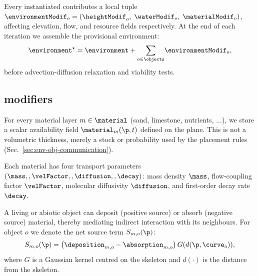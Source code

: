 
\section{}
\label{sec:env-obj-materials}

Every instantiated  contributes a local  tuple $\environmentModif_o=(\heightModif_o, \;\waterModif_o, \;\materialModif_o)$, affecting elevation, flow, and resource fields respectively. At the end of each iteration we assemble the provisional environment:
\begin{align}
    \environment^{\star} = \environment + {\sum_{o\in\objects}}\environmentModif_o,
\end{align}
before advection-diffusion relaxation and viability tests.

\subsection{ modifiers}

For every material layer $m \in \material$ (sand, limestone, nutrients, ...), we store a scalar availability field $\material_m(\p,t)$ defined on the plane. This is not a volumetric thickness, merely a stock or probability used by the placement rules (Sec.~\ref{sec:env-obj-communication}).

Each material has four transport parameters $(\mass,,\velFactor,,\diffusion,,\decay)$: mass density $\mass$, flow-coupling factor $\velFactor$, molecular diffusivity $\diffusion$, and first-order decay rate $\decay$.

A living or abiotic object can deposit (positive source) or absorb (negative source) material, thereby mediating indirect interaction with its neighbours. For object $o$ we denote the net source term $S_{m,o}(\p)$:
\begin{align}
    S_{m,o}(\p) = \left(\deposition_{m,o} - \absorption_{m,o}\right) G(d(\p,\curve_o)),
\end{align}
where $G$ is a Gaussian kernel centred on the skeleton and $d(\cdot)$ is the distance from the skeleton.

